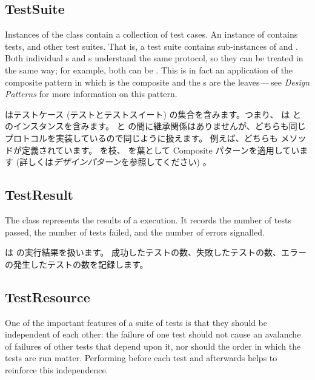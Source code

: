 \documentclass[a4paper,10pt,twoside]{book}
\begin{document}
\subsection{TestSuite}

Instances of the class  contain a collection of test cases.  An
instance of  contains tests, and other test suites.
That is, a test suite contains sub-instances of
 and .
Both individual s and s understand the same protocol, so they can be treated in the same way; for example, both can be .
This is in fact an application of the composite
pattern in which  is the composite and the
s are the leaves\,---\,see \textit{Design Patterns} for more information on this pattern\cite{Gamm95a}.
\fi

 はテストケース (テストとテストスイート) の集合を含みます。つまり、  は  と  のインスタンスを含みます。
 と  の間に継承関係はありませんが、どちらも同じプロトコルを実装しているので同じように扱えます。
例えば、どちらも  メソッドが定義されています。
 を枝、  を葉として Composite パターンを適用しています (詳しくは\textit{デザインパターン}を参照してください) 。

\subsection{TestResult}

The class  represents the results of a
 execution.  It records the number of tests passed,
the number of tests failed, and the number of errors signalled.
\fi

 は  の実行結果を扱います。
成功したテストの数、失敗したテストの数、エラーの発生したテストの数を記録します。

\subsection{TestResource}

One of the important  features of a suite of tests is that they should be independent of each other: the failure of one test should not cause an avalanche of failures of other tests that depend upon it, nor should the order in which the tests are run matter.
Performing  before each test and  afterwards helps to reinforce this independence. 
\fi
\end{document}
